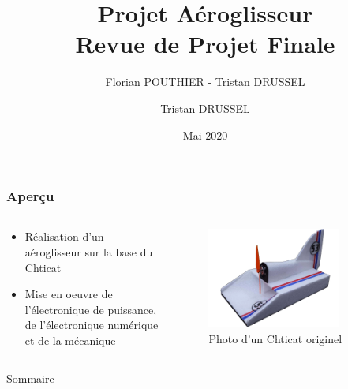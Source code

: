 \documentclass{beamer}
\title[Revue de projet Final]{Projet Aéroglisseur \\Revue de Projet Finale}
\author[]{Florian POUTHIER - Tristan DRUSSEL}
\date{Mai 2020}
\institute{4ème année Génie Électrique \\ INSA Strasbourg}
\begin{document}
\author[]{Tristan DRUSSEL}
	\begin{frame}
		\titlepage
	\end{frame}
	\begin{frame}
		\frametitle{Aperçu}
		\begin{columns}[T]
	  		\begin{column}{0.5\textwidth}
	  		\begin{itemize}
	  			\item Réalisation d'un aéroglisseur sur la base du Chticat
				\item Mise en oeuvre de l'électronique de puissance, de l'électronique numérique et de la mécanique
	  		\end{itemize}
	    	
	  		\end{column}
	  		\begin{column}{0.5\textwidth}
	  			\begin{figure}
	    			\includegraphics[width=0.8\textwidth]{"../Illus/Chticat.png"}
	    			\caption{Photo d'un Chticat originel}
	    		 \end{figure}
	  		\end{column}
		\end{columns}
	\end{frame}
	\begin{frame}{Sommaire}
		\setcounter{tocdepth}{1}
		\tableofcontents
	\end{frame}
\end{document}
